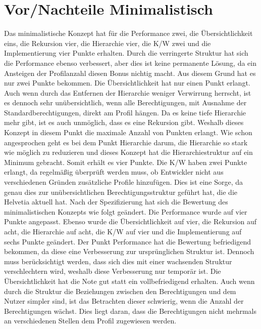 \section{Vor/Nachteile Minimalistisch}
\label{sec:chapter05:Minimalistisch}
Das minimalistische Konzept hat für die Performance zwei, die Übersichtlichkeit eins, die Rekursion vier, die Hierarchie vier, die \ac{K/W} zwei und die Implementierung vier Punkte erhalten.
Durch die verringerte Struktur hat sich die Performance ebenso verbessert, aber dies ist keine permanente Lösung, da ein Ansteigen der Profilanzahl diesen Bonus nichtig macht.
Aus diesem Grund hat es nur zwei Punkte bekommen.
Die Übersichtlichkeit hat nur einen Punkt erlangt.
Auch wenn durch das Entfernen der Hierarchie weniger Verwirrung herrscht, ist es dennoch sehr unübersichtlich, wenn alle Berechtigungen, mit Ausnahme der Standardberechtigungen, direkt am Profil hängen.
Da es keine tiefe Hierarchie mehr gibt, ist es auch unmöglich, dass es eine Rekursion gibt.
Weshalb dieses Konzept in diesem Punkt die maximale Anzahl von Punkten erlangt.
Wie schon angesprochen geht es bei dem Punkt Hierarchie darum, die Hierarchie so stark wie möglich zu reduzieren und dieses Konzept hat die Hierarchiestruktur auf ein Minimum gebracht. Somit erhält es vier Punkte.
Die \ac{K/W} haben zwei Punkte erlangt, da regelmäßig überprüft werden muss, ob Entwickler nicht aus verschiedenen Gründen zusätzliche Profile hinzufügen.
Dies ist eine Sorge, da genau dies zur unübersichtlichen Berechtigungsstruktur geführt hat, die die Helvetia aktuell hat.
\newline
\newline
Nach der Spezifizierung hat sich die Bewertung des minimalistischen Konzepts wie folgt geändert.
Die Performance wurde auf vier Punkte angepasst. Ebenso wurde die Übersichtlichkeit auf vier, die Rekursion auf acht, die Hierarchie auf acht, die \ac{K/W} auf vier und die Implementierung auf sechs Punkte geändert.
Der Punkt Performance hat die Bewertung befriedigend bekommen, da diese eine Verbesserung zur ursprünglichen Struktur ist.
Dennoch muss berücksichtigt werden, dass sich dies mit einer wachsenden Struktur verschlechtern wird, weshalb diese Verbesserung nur temporär ist.
Die Übersichtlichkeit hat die Note gut statt ein vollbefriedigend erhalten.
Auch wenn durch die Struktur die Beziehungen zwischen den Berechtigungen und dem Nutzer simpler sind, ist das Betrachten dieser schwierig, wenn die Anzahl der Berechtigungen wächst.
Dies liegt daran, dass die Berechtigungen nicht mehrmals an verschiedenen Stellen dem Profil zugewiesen werden.
